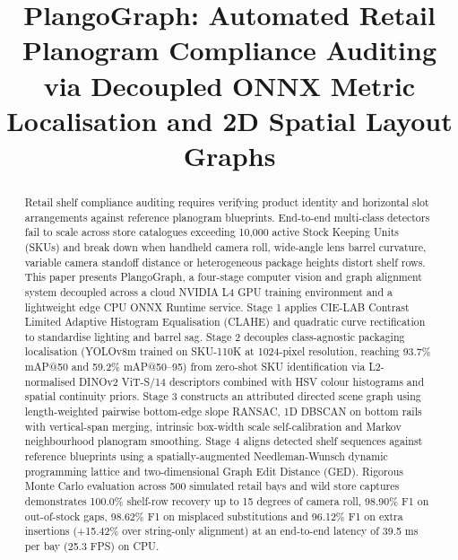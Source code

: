 \documentclass[conference]{IEEEtran}
\begin{document}
\title{PlangoGraph: Automated Retail Planogram Compliance Auditing via Decoupled ONNX Metric Localisation and 2D Spatial Layout Graphs}

\author{
}

\maketitle

\begin{abstract}
Retail shelf compliance auditing requires verifying product identity and horizontal slot arrangements against reference planogram blueprints. End-to-end multi-class detectors fail to scale across store catalogues exceeding 10,000 active Stock Keeping Units (SKUs) and break down when handheld camera roll, wide-angle lens barrel curvature, variable camera standoff distance or heterogeneous package heights distort shelf rows. This paper presents PlangoGraph, a four-stage computer vision and graph alignment system decoupled across a cloud NVIDIA L4 GPU training environment and a lightweight edge CPU ONNX Runtime service. Stage 1 applies CIE-LAB Contrast Limited Adaptive Histogram Equalisation (CLAHE) and quadratic curve rectification to standardise lighting and barrel sag. Stage 2 decouples class-agnostic packaging localisation (YOLOv8m trained on SKU-110K at 1024-pixel resolution, reaching 93.7\% mAP@50 and 59.2\% mAP@50--95) from zero-shot SKU identification via L2-normalised DINOv2 ViT-S/14 descriptors combined with HSV colour histograms and spatial continuity priors. Stage 3 constructs an attributed directed scene graph using length-weighted pairwise bottom-edge slope RANSAC, 1D DBSCAN on bottom rails with vertical-span merging, intrinsic box-width scale self-calibration and Markov neighbourhood planogram smoothing. Stage 4 aligns detected shelf sequences against reference blueprints using a spatially-augmented Needleman-Wunsch dynamic programming lattice and two-dimensional Graph Edit Distance (GED). Rigorous Monte Carlo evaluation across 500 simulated retail bays and wild store captures demonstrates 100.0\% shelf-row recovery up to 15 degrees of camera roll, 98.90\% F1 on out-of-stock gaps, 98.62\% F1 on misplaced substitutions and 96.12\% F1 on extra insertions (+15.42\% over string-only alignment) at an end-to-end latency of 39.5 ms per bay (25.3 FPS) on CPU.
\end{abstract}
\end{document}
